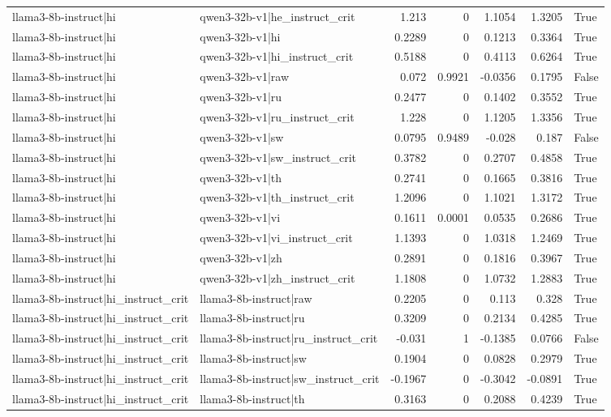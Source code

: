 \begin{table}
\begin{tabular}{l l r r r r l}
llama3-8b-instruct|hi & qwen3-32b-v1|he_instruct_crit & 1.213 & 0 & 1.1054 & 1.3205 & True \\
llama3-8b-instruct|hi & qwen3-32b-v1|hi & 0.2289 & 0 & 0.1213 & 0.3364 & True \\
llama3-8b-instruct|hi & qwen3-32b-v1|hi_instruct_crit & 0.5188 & 0 & 0.4113 & 0.6264 & True \\
llama3-8b-instruct|hi & qwen3-32b-v1|raw & 0.072 & 0.9921 & -0.0356 & 0.1795 & False \\
llama3-8b-instruct|hi & qwen3-32b-v1|ru & 0.2477 & 0 & 0.1402 & 0.3552 & True \\
llama3-8b-instruct|hi & qwen3-32b-v1|ru_instruct_crit & 1.228 & 0 & 1.1205 & 1.3356 & True \\
llama3-8b-instruct|hi & qwen3-32b-v1|sw & 0.0795 & 0.9489 & -0.028 & 0.187 & False \\
llama3-8b-instruct|hi & qwen3-32b-v1|sw_instruct_crit & 0.3782 & 0 & 0.2707 & 0.4858 & True \\
llama3-8b-instruct|hi & qwen3-32b-v1|th & 0.2741 & 0 & 0.1665 & 0.3816 & True \\
llama3-8b-instruct|hi & qwen3-32b-v1|th_instruct_crit & 1.2096 & 0 & 1.1021 & 1.3172 & True \\
llama3-8b-instruct|hi & qwen3-32b-v1|vi & 0.1611 & 0.0001 & 0.0535 & 0.2686 & True \\
llama3-8b-instruct|hi & qwen3-32b-v1|vi_instruct_crit & 1.1393 & 0 & 1.0318 & 1.2469 & True \\
llama3-8b-instruct|hi & qwen3-32b-v1|zh & 0.2891 & 0 & 0.1816 & 0.3967 & True \\
llama3-8b-instruct|hi & qwen3-32b-v1|zh_instruct_crit & 1.1808 & 0 & 1.0732 & 1.2883 & True \\
llama3-8b-instruct|hi_instruct_crit & llama3-8b-instruct|raw & 0.2205 & 0 & 0.113 & 0.328 & True \\
llama3-8b-instruct|hi_instruct_crit & llama3-8b-instruct|ru & 0.3209 & 0 & 0.2134 & 0.4285 & True \\
llama3-8b-instruct|hi_instruct_crit & llama3-8b-instruct|ru_instruct_crit & -0.031 & 1 & -0.1385 & 0.0766 & False \\
llama3-8b-instruct|hi_instruct_crit & llama3-8b-instruct|sw & 0.1904 & 0 & 0.0828 & 0.2979 & True \\
llama3-8b-instruct|hi_instruct_crit & llama3-8b-instruct|sw_instruct_crit & -0.1967 & 0 & -0.3042 & -0.0891 & True \\
llama3-8b-instruct|hi_instruct_crit & llama3-8b-instruct|th & 0.3163 & 0 & 0.2088 & 0.4239 & True \\

\end{tabular}
\end{table}
